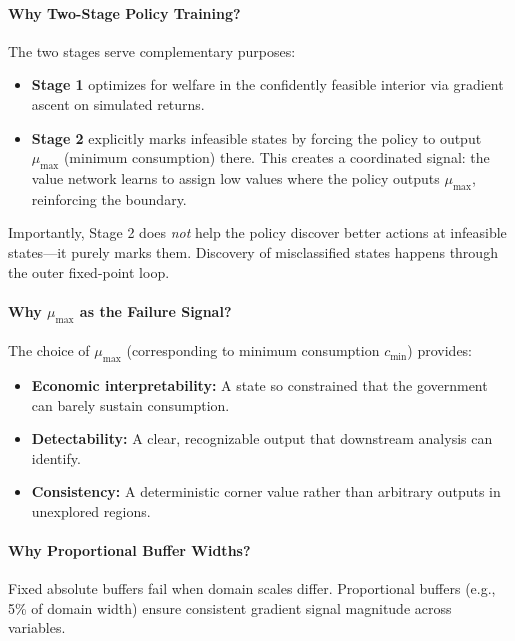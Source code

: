 \paragraph{Why Two-Stage Policy Training?}
The two stages serve complementary purposes:
\begin{itemize}
    \item \textbf{Stage 1} optimizes for welfare in the confidently feasible interior via gradient ascent on simulated returns.
    \item \textbf{Stage 2} explicitly marks infeasible states by forcing the policy to output $\mu_{\max}$ (minimum consumption) there. This creates a coordinated signal: the value network learns to assign low values where the policy outputs $\mu_{\max}$, reinforcing the boundary.
\end{itemize}
Importantly, Stage 2 does \textit{not} help the policy discover better actions at infeasible states---it purely marks them. Discovery of misclassified states happens through the outer fixed-point loop.

\paragraph{Why $\mu_{\max}$ as the Failure Signal?}
The choice of $\mu_{\max}$ (corresponding to minimum consumption $c_{\min}$) provides:
\begin{itemize}
    \item \textbf{Economic interpretability:} A state so constrained that the government can barely sustain consumption.
    \item \textbf{Detectability:} A clear, recognizable output that downstream analysis can identify.
    \item \textbf{Consistency:} A deterministic corner value rather than arbitrary outputs in unexplored regions.
\end{itemize}

\paragraph{Why Proportional Buffer Widths?}
Fixed absolute buffers fail when domain scales differ. Proportional buffers (e.g., 5\% of domain width) ensure consistent gradient signal magnitude across variables.

